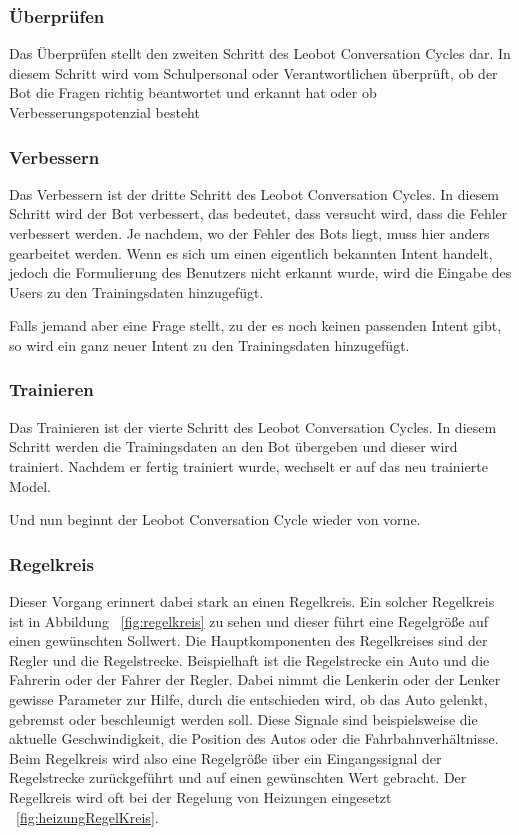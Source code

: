 \subsubsection{Überprüfen}

Das Überprüfen stellt den zweiten Schritt des Leobot Conversation Cycles dar.
In diesem Schritt wird vom Schulpersonal oder Verantwortlichen überprüft, ob der Bot die Fragen richtig beantwortet und erkannt hat oder ob Verbesserungspotenzial besteht

\subsubsection{Verbessern}
Das Verbessern ist der dritte Schritt des Leobot Conversation Cycles.
In diesem Schritt wird der Bot verbessert, das bedeutet, dass versucht wird, dass die Fehler verbessert werden.
Je nachdem, wo der Fehler des Bots liegt, muss hier anders gearbeitet werden.
Wenn es sich um einen eigentlich bekannten Intent handelt, jedoch die Formulierung des Benutzers nicht erkannt wurde, wird die Eingabe des Users zu den Trainingsdaten hinzugefügt.

Falls jemand aber eine Frage stellt, zu der es noch keinen passenden Intent gibt, so wird ein ganz neuer Intent zu den Trainingsdaten hinzugefügt.

\subsubsection{Trainieren}
Das Trainieren ist der vierte Schritt des Leobot Conversation Cycles.
In diesem Schritt werden die Trainingsdaten an den Bot übergeben und dieser wird trainiert.
Nachdem er fertig trainiert wurde, wechselt er auf das neu trainierte Model.

Und nun beginnt der Leobot Conversation Cycle wieder von vorne.

\subsubsection{Regelkreis}

Dieser Vorgang erinnert dabei stark an einen Regelkreis.
Ein solcher Regelkreis ist in Abbildung ~\ref{fig:regelkreis} zu sehen und dieser führt eine Regelgröße auf einen gewünschten Sollwert.
Die Hauptkomponenten des Regelkreises sind der Regler und die Regelstrecke.
Beispielhaft ist die Regelstrecke ein Auto und die Fahrerin oder der Fahrer der Regler.
Dabei nimmt die Lenkerin oder der Lenker gewisse Parameter zur Hilfe, durch die entschieden wird, ob das Auto gelenkt, gebremst oder beschleunigt werden soll.
Diese Signale sind beispielsweise die aktuelle Geschwindigkeit, die Position des Autos oder die Fahrbahnverhältnisse.
Beim Regelkreis wird also eine Regelgröße über ein Eingangssignal der Regelstrecke zurückgeführt und auf einen gewünschten Wert gebracht.
Der Regelkreis wird oft bei der Regelung von Heizungen eingesetzt ~\ref{fig:heizungRegelKreis}.\cite{regelkreis, regelkreisBeispiel}

